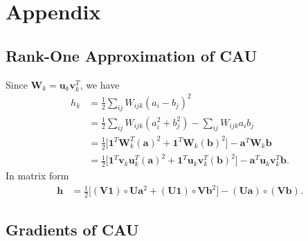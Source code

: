 \documentclass[conference]{IEEEtran}
\begin{document}
\section*{Appendix}

\subsection*{Rank-One Approximation of CAU}

Since $\mathbf{W}_k = \mathbf{u}_{k}\mathbf{v}_{k}^T$, we have
\begin{align}
h_k &= \frac{1}{2}\sum_{ij}W_{ijk}(a_i-b_j)^2  \\
&= \frac{1}{2}\sum_{ij}W_{ijk}(a_i^2+b_j^2) -\sum_{ij}W_{ijk}a_ib_j \\
&= \frac{1}{2}\Big[\mathbf{1}^T\mathbf{W}^T_k(\mathbf{a})^2  +  \mathbf{1}^T\mathbf{W}_k(\mathbf{b})^2\Big] - \mathbf{a}^T \mathbf{W}_k \mathbf{b}  \\
&= \frac{1}{2}\Big[\mathbf{1}^T\mathbf{v}_k\mathbf{u}^T_k(\mathbf{a})^2  +  \mathbf{1}^T\mathbf{u}_k\mathbf{v}^T_k(\mathbf{b})^2\Big] - \mathbf{a}^T \mathbf{u}_k\mathbf{v}^T_k \mathbf{b}.
\end{align}
In matrix form
\begin{align}
\mathbf{h} &= \frac{1}{2}\Big[
(\mathbf{V}\mathbf{1}) \circ \mathbf{U}\mathbf{a}^2 + (\mathbf{U}\mathbf{1}) \circ \mathbf{V}\mathbf{b}^2\Big] - (\mathbf{U}\mathbf{a}) \circ (\mathbf{V} \mathbf{b}).
\end{align}

\subsection*{Gradients of CAU}
\end{document}
